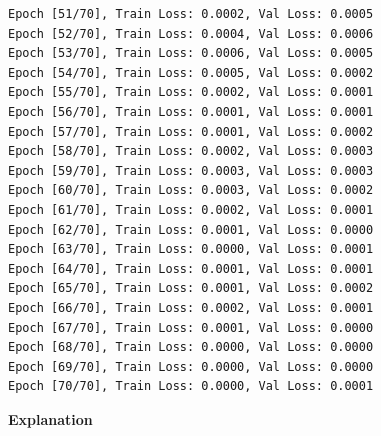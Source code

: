 \begin{lstlisting}
Epoch [51/70], Train Loss: 0.0002, Val Loss: 0.0005
Epoch [52/70], Train Loss: 0.0004, Val Loss: 0.0006
Epoch [53/70], Train Loss: 0.0006, Val Loss: 0.0005
Epoch [54/70], Train Loss: 0.0005, Val Loss: 0.0002
Epoch [55/70], Train Loss: 0.0002, Val Loss: 0.0001
Epoch [56/70], Train Loss: 0.0001, Val Loss: 0.0001
Epoch [57/70], Train Loss: 0.0001, Val Loss: 0.0002
Epoch [58/70], Train Loss: 0.0002, Val Loss: 0.0003
Epoch [59/70], Train Loss: 0.0003, Val Loss: 0.0003
Epoch [60/70], Train Loss: 0.0003, Val Loss: 0.0002
Epoch [61/70], Train Loss: 0.0002, Val Loss: 0.0001
Epoch [62/70], Train Loss: 0.0001, Val Loss: 0.0000
Epoch [63/70], Train Loss: 0.0000, Val Loss: 0.0001
Epoch [64/70], Train Loss: 0.0001, Val Loss: 0.0001
Epoch [65/70], Train Loss: 0.0001, Val Loss: 0.0002
Epoch [66/70], Train Loss: 0.0002, Val Loss: 0.0001
Epoch [67/70], Train Loss: 0.0001, Val Loss: 0.0000
Epoch [68/70], Train Loss: 0.0000, Val Loss: 0.0000
Epoch [69/70], Train Loss: 0.0000, Val Loss: 0.0000
Epoch [70/70], Train Loss: 0.0000, Val Loss: 0.0001
\end{lstlisting}

\textbf{Explanation}

